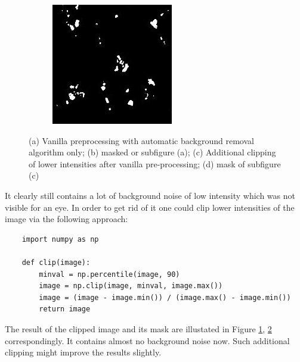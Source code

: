 \begin{figure}[htb]
\begin{subfigure}[b]{0.22\textwidth}
		\caption{}
		\label{subfig:clipping}
	\end{subfigure}
	\hfill
	\begin{subfigure}[b]{0.22\textwidth}
		\centering
		\includegraphics[width=\textwidth]{bilder/preprocessing/crop_golgi_full_processed_mask.png}
		\caption{}
		\label{subfig:clipping-mask}
	\end{subfigure}
	   \caption{(a) Vanilla preprocessing with automatic background removal algorithm only; (b) masked or subfigure (a); (c) Additional clipping of lower intensities after vanilla pre-processing; (d) mask of subfigure (c)}
	   \label{fig:pre-processing-golgi}
\end{figure}
It clearly still contains a lot of background noise of low intensity which was not visible for an eye. In order to get rid of it one could clip lower intensities of the image via the following approach:
\begin{lstlisting}
	import numpy as np
		
	def clip(image):
		minval = np.percentile(image, 90)
		image = np.clip(image, minval, image.max())
		image = (image - image.min()) / (image.max() - image.min())
		return image
\end{lstlisting}

The result of the clipped image and its mask are illustated in Figure \ref{subfig:clipping}, \ref{subfig:clipping-mask} correspondingly. It contains almost no background noise now. Such additional clipping might improve the results slightly.